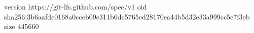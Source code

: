 version https://git-lfs.github.com/spec/v1
oid sha256:3b6aafdc0168a0cceb09e311b6dc5765ed28170ea44b5d32e33a999cc5e7f3eb
size 445660
